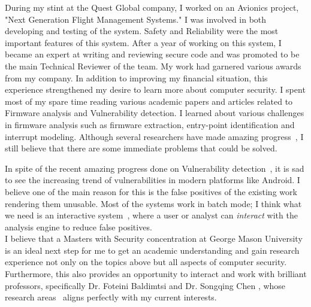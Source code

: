 \documentclass{article}
\begin{document}
During my stint at the Quest Global company, I worked on an Avionics project, "Next Generation Flight Management Systems." I was involved in both developing and testing of the system. Safety and Reliability were the most important features of this system. After a year of working
 on this system, I became an expert at writing and reviewing secure code and was promoted to be the main Technical Reviewer of the team. My work had garnered various awards from my company. In addition to improving my financial situation, this experience strengthened my desire to learn more about computer security. I spent most of my spare time reading various academic papers and articles related to Firmware analysis and Vulnerability detection. I learned about various challenges in firmware analysis such as firmware extraction, entry-point identification and interrupt modeling. Although several researchers have made amazing progress~\cite{zaddach2014avatar, shoshitaishvili2015firmalice, costin2014large}, I still believe that there are some immediate problems that could be solved.

In spite of the recent amazing progress done on Vulnerability detection~\cite{machiry2017dr, redini2017bootstomp}, it is sad to see the increasing trend of vulnerabilities in modern platforms like Android. I believe one of the main reason for this is the false positives of the existing work rendering them unusable. Most of the systems work in batch mode; I think what we need is an interactive system~\cite{Mangal:2015:UAP:2786805.2786851}, where a user or analyst can \emph{interact} with the analysis engine to reduce false positives.\\

I believe that a Masters with Security concentration at George Mason University is an ideal next step for me to get an academic understanding and gain research experience not only on the topics above but all aspects of computer security. Furthermore, this also provides an opportunity to interact and work with brilliant professors, specifically Dr. Foteini Baldimtsi and Dr. Songqing Chen
, whose research areas~\cite{foteinibaldimtsi, foteinibaldimtsi2, songqingchen} aligns perfectly with my current interests.

\medskip

{}

\end{document}
